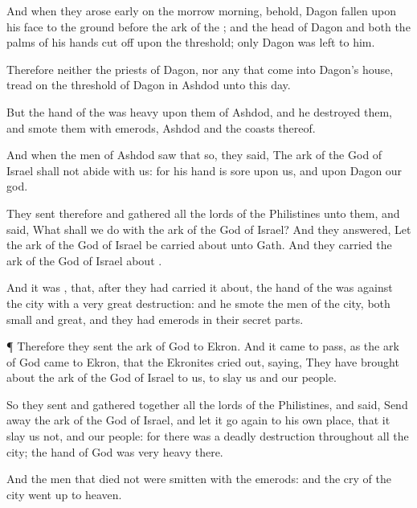 {And when they arose
early on the
morrow
morning, behold,
Dagon
{}
fallen upon his
face to the
ground
before the
ark of the
{}; and the
head of
Dagon and
both the
palms of his
hands
{} cut
off upon the
threshold; only
{}
Dagon was
left to him.

Therefore neither the
priests of
Dagon, nor any that
come into
Dagon’s
house,
tread on the
threshold of
Dagon in
Ashdod unto this
day.


\par }{\PP {}But the
hand of the
{} was
heavy upon them of
Ashdod, and he
destroyed them, and
smote them with
emerods,
{}
Ashdod and the
coasts thereof.

And when the
men of
Ashdod
saw that
{} so, they
said, The
ark of the
God of
Israel shall not
abide with us: for his
hand is
sore upon us, and upon
Dagon our
god.

They
sent therefore and
gathered all the
lords of the
Philistines unto them, and
said, What shall we
do with the
ark of the
God of
Israel? And they
answered, Let the
ark of the
God of
Israel be carried
about unto
Gath. And they
carried the
ark of the
God of
Israel
about
{}.

And it was
{}, that,
after they had carried it
about, the
hand of the
{} was against the
city with a
very
great
destruction: and he
smote the
men of the
city, both
small and
great, and they had
emerods in their secret
parts.


\par }{\PP {}¶ Therefore they
sent the
ark of
God to
Ekron. And it came to pass, as the
ark of
God
came to
Ekron, that the
Ekronites cried
out,
saying, They have brought
about the
ark of the
God of
Israel to us, to
slay us and our
people.

So they
sent and gathered
together all the
lords of the
Philistines, and
said, Send
away the
ark of the
God of
Israel, and let it go
again to his own
place, that it
slay us not, and our
people: for there was a
deadly
destruction throughout all the
city; the
hand of
God was
very
heavy there.

And the
men that
died not were
smitten with the
emerods: and the
cry of the
city went
up to
heaven.




}
